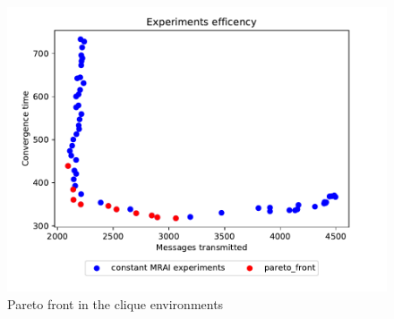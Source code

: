 \documentclass[10pt,conference,letterpaper]{IEEEtran}
\newcommand{\figwidth}{0.78}
\newcommand{\figvspace}{-1.5em}
\begin{document}
\begin{figure}[tb]
	\centering
	\includegraphics[width=\figwidth\columnwidth]{images/clique/pareto-clique-constant}
	\caption{Pareto front in the clique environments}
	\label{fig:clique_pareto_freq}
	\vspace{\figvspace}
\end{figure}
\end{document}
